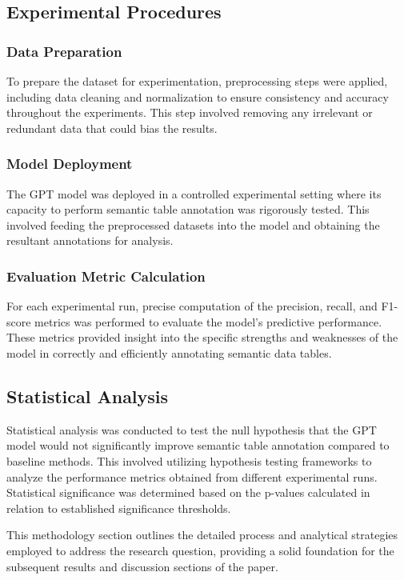 \documentclass{article}
\begin{document}
\subsection{Experimental Procedures}

\subsubsection{Data Preparation}
To prepare the dataset for experimentation, preprocessing steps were applied, including data cleaning and normalization to ensure consistency and accuracy throughout the experiments. This step involved removing any irrelevant or redundant data that could bias the results.

\subsubsection{Model Deployment}
The GPT model was deployed in a controlled experimental setting where its capacity to perform semantic table annotation was rigorously tested. This involved feeding the preprocessed datasets into the model and obtaining the resultant annotations for analysis.

\subsubsection{Evaluation Metric Calculation}
For each experimental run, precise computation of the precision, recall, and F1-score metrics was performed to evaluate the model's predictive performance. These metrics provided insight into the specific strengths and weaknesses of the model in correctly and efficiently annotating semantic data tables.

\subsection{Statistical Analysis}

Statistical analysis was conducted to test the null hypothesis that the GPT model would not significantly improve semantic table annotation compared to baseline methods. This involved utilizing hypothesis testing frameworks to analyze the performance metrics obtained from different experimental runs. Statistical significance was determined based on the p-values calculated in relation to established significance thresholds.

This methodology section outlines the detailed process and analytical strategies employed to address the research question, providing a solid foundation for the subsequent results and discussion sections of the paper.
\end{document}
